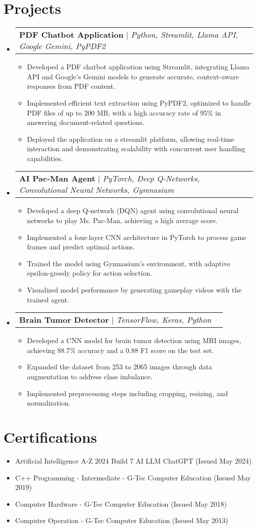 \documentclass[letterpaper,11pt]{article}
\makeatletter
\newcommand{\resumeItem}[1]{
  \item\small{
    {#1 \vspace{-2pt}}
  }
}
\newcommand{\resumeProjectHeading}[2]{
    \item
    \begin{tabular*}{0.97\textwidth}{l@{\extracolsep{\fill}}r}
      \small#1 & #2 \\
    \end{tabular*}\vspace{-7pt}
}
\newcommand{\resumeSubHeadingListStart}{\begin{itemize}[leftmargin=0.15in, label={}]}
\newcommand{\resumeSubHeadingListEnd}{\end{itemize}}
\newcommand{\resumeItemListStart}{\begin{itemize}}
\newcommand{\resumeItemListEnd}{\end{itemize}\vspace{-5pt}}
\makeatother
\begin{document}
\section{Projects}
    \resumeSubHeadingListStart
      \resumeProjectHeading
          {\textbf{PDF Chatbot Application} $|$ \emph{Python, Streamlit, Llama API, Google Gemini, PyPDF2}}{}
          \resumeItemListStart
            \resumeItem{Developed a PDF chatbot application using Streamlit, integrating Llama API and Google’s Gemini models to generate accurate, context-aware responses from PDF content.}
            \resumeItem{Implemented efficient text extraction using PyPDF2, optimized to handle PDF files of up to 200 MB, with a high accuracy rate of 95\% in answering document-related questions.}
            \resumeItem{Deployed the application on a streamlit platform, allowing real-time interaction and demonstrating scalability with concurrent user handling capabilities.}
          \resumeItemListEnd
      \resumeProjectHeading
          {\textbf{AI Pac-Man Agent} $|$ \emph{PyTorch, Deep Q-Networks, Convolutional Neural Networks, Gymnasium}}{}
    \resumeItemListStart
        \resumeItem{Developed a deep Q-network (DQN) agent using convolutional neural networks to play Ms. Pac-Man, achieving a high average score.}
        \resumeItem{Implemented a four-layer CNN architecture in PyTorch to process game frames and predict optimal actions.}
        \resumeItem{Trained the model using Gymnasium's environment, with adaptive epsilon-greedy policy for action selection.}
        \resumeItem{Visualized model performance by generating gameplay videos with the trained agent.}
          \resumeItemListEnd
      \resumeProjectHeading
          {\textbf{Brain Tumor Detector} $|$ \emph{TensorFlow, Keras, Python}}{}
          \resumeItemListStart
            \resumeItem{Developed a CNN model for brain tumor detection using MRI images, achieving 88.7\% accuracy and a 0.88 F1 score on the test set.}
            \resumeItem{Expanded the dataset from 253 to 2065 images through data augmentation to address class imbalance.}
            \resumeItem{Implemented preprocessing steps including cropping, resizing, and normalization.}
          \resumeItemListEnd
    \resumeSubHeadingListEnd

\section{Certifications}
  \resumeSubHeadingListStart
    \resumeItemListStart
      \resumeItem{Artificial Intelligence A-Z 2024 Build 7 AI LLM ChatGPT (Issued May 2024)}
      \resumeItem{C++ Programming - Intermediate - G-Tec Computer Education (Issued May 2019)}
      \resumeItem{Computer Hardware - G-Tec Computer Education (Issued May 2018)}
      \resumeItem{Computer Operation - G-Tec Computer Education (Issued May 2013)}
    \resumeItemListEnd
  \resumeSubHeadingListEnd
\end{document}
